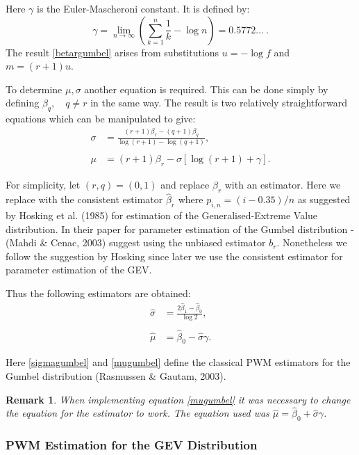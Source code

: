 \documentclass{article}
\newtheorem*{remark}{Remark}
\begin{document}
Here $\gamma$ is the Euler-Mascheroni constant. It is defined by:
$$\gamma = \lim_{n\to\infty} \left ( \sum_{k=1}^n \frac{1}{k} - \log n \right ) = 0.5772\ldots \ . $$
The result \eqref{betargumbel} arises from substitutions $u = -\log f$ and $m = (r+1)u$.

To determine $\mu, \sigma$ another equation is required. This can be done simply by defining $\beta_q, \quad q\neq r$ in the same way. The result is two relatively straightforward equations which can be manipulated to give:
\begin{align}
\sigma &= \frac{(r+1)\beta_r - (q+1)\beta_q}{\log(r+1) - \log(q+1)}, \\
\nonumber \\
\mu &= (r+1)\beta_r - \sigma[\log(r+1) + \gamma].
\end{align}

For simplicity, let $(r,q) = (0,1)$ and replace $\beta_r$ with an estimator. Here we replace with the consistent estimator $\hat{\beta}_r$ where $p_{i,n} = (i-0.35)/n$ as suggested by Hosking et al. (1985) for estimation of the Generalised-Extreme Value distribution. In their paper for parameter estimation of the Gumbel distribution - (Mahdi \& Cenac, 2003) suggest using the unbiased estimator $b_r$. Nonetheless we follow the suggestion by Hosking since later we use the consistent estimator for parameter estimation of the GEV. 

Thus the following estimators are obtained:
\begin{align}
\hat{\sigma} &= \frac{2\hat{\beta}_1 - \hat{\beta}_0}{\log 2} \label{sigmagumbel},\\
\nonumber \\
\hat{\mu} &= \hat{\beta}_0 - \hat{\sigma}\gamma \label{mugumbel}.
\end{align}

Here \eqref{sigmagumbel} and \eqref{mugumbel} define the classical PWM estimators for the Gumbel distribution (Rasmussen \& Gautam, 2003).

\begin{remark}
When implementing equation \eqref{mugumbel} it was necessary to change the equation for the estimator to work. The equation used was $\hat{\mu} = \hat{\beta}_0 + \hat{\sigma}\gamma$. 
\end{remark}

\subsubsection{PWM Estimation for the GEV Distribution}
\end{document}
